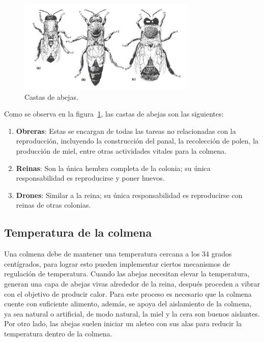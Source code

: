 \begin{figure}[htbp]
    \centering
    \includegraphics[width=0.75\textwidth]{assets/abejas.png}
    \caption{Castas de abejas. \cite{david_cramp}}
    \label{fig:abejas}
\end{figure}

Como se observa en la figura~\ref{fig:abejas}, las castas de abejas son las siguientes:
\begin{enumerate}
    \renewcommand\labelenumi{\alph{enumi})}
    \item \textbf{Obreras}: Estas se encargan de todas las tareas no relacionadas con la reproducción, incluyendo la construcción del panal, la recolección de polen, la producción de miel, entre otras actividades vitales para la colmena.
    \item \textbf{Reinas}: Son la única hembra completa de la colonia; su única responsabilidad es reproducirse y poner huevos.
    \item \textbf{Drones}: Similar a la reina; su única responsabilidad es reproducirse con reinas de otras colonias.
\end{enumerate}

\subsection{Temperatura de la colmena}
Una colmena debe de mantener una temperatura cercana a los 34 grados centígrados, para lograr esto pueden implementar ciertos mecanismos de regulación de temperatura. \cite{david_cramp}
Cuando las abejas necesitan elevar la temperatura, generan una capa de abejas vivas alrededor de la reina, después proceden a vibrar con el objetivo de producir calor. Para este proceso es necesario que la colmena cuente con suficiente alimento, además, se apoya del aislamiento de la colmena, ya sea natural o artificial, de modo natural, la miel y la cera son buenos aislantes. \cite{chadwick_alton_tennant_fitzmaurice_earl_2016}
Por otro lado, las abejas suelen iniciar un aleteo con sus alas para reducir la temperatura dentro de la colmena. \cite{chadwick_alton_tennant_fitzmaurice_earl_2016}

